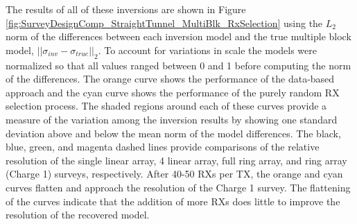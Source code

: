 \documentclass[preprint,authoryear,12pt]{elsarticle}
\begin{document}
The results of all of these inversions are shown in Figure \ref{fig:SurveyDesignComp_StraightTunnel_MultiBlk_RxSelection} using the $L_2$ norm of the differences between each inversion model and the true multiple block model, $\left|| \sigma_{inv} - \sigma_{true} \right||_2$. To account for variations in scale the models were normalized so that all values ranged between 0 and 1 before computing the norm of the differences. The orange curve shows the performance of the data-based approach and the cyan curve shows the performance of the purely random RX selection process. The shaded regions around each of these curves provide a measure of the variation among the inversion results by showing one standard deviation above and below the mean norm of the model differences. The black, blue, green, and magenta dashed lines provide comparisons of the relative resolution of the single linear array, 4 linear array, full ring array, and ring array (Charge 1) surveys, respectively. After 40-50 RXs per TX, the orange and cyan curves flatten and approach the resolution of the Charge 1 survey. The flattening of the curves indicate that the addition of more RXs does little to improve the resolution of the recovered model.
\end{document}
